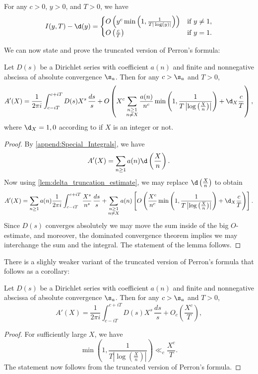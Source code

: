       \begin{lemma}\label{lem:delta_truncation_estimate}
        For any $c > 0$, $y > 0$, and $T > 0$, we have
        \[
          I(y,T)-\d(y) = \begin{cases} O\left(y^{c}\min\left(1,\frac{1}{T|\log(y)|}\right)\right) & \text{if $y \neq 1$}, \\ O\left(\frac{c}{T}\right) & \text{if $y = 1$}. \end{cases}
        \]
      \end{lemma}

      We can now state and prove the truncated version of Perron's formula:

      \begin{theorem}
        Let $D(s)$ be a Dirichlet series with coefficient $a(n)$ and finite and nonnegative abscissa of absolute convergence $\s_{a}$. Then for any $c > \s_{a}$ and $T > 0$,
        \[
          A'(X) = \frac{1}{2\pi i}\int_{c-iT}^{c+iT}D(s)X^{s}\,\frac{ds}{s}+O\left(X^{c}\sum_{\substack{n \ge 1 \\ n \neq X}}\frac{a(n)}{n^{c}}\min\left(1,\frac{1}{T\left|\log\left(\frac{X}{n}\right)\right|}\right)+\d_{X}\frac{c}{T}\right),
        \]
        where $\d_{X} = 1,0$ according to if $X$ is an integer or not.
      \end{theorem}
      \begin{proof}
        By \cref{append:Special_Integrals}, we have
        \[
          A'(X) = \sum_{n \ge 1}a(n)\d\left(\frac{X}{n}\right).
        \]
        Now using \cref{lem:delta_truncation_estimate}, we may replace $\d\left(\frac{X}{n}\right)$ to obtain
        \[
          A'(X) = \sum_{n \ge 1}a(n)\frac{1}{2\pi i}\int_{c-iT}^{c+iT}\frac{X^{s}}{n^{s}}\,\frac{ds}{s}+\sum_{\substack{n \ge 1 \\ n \neq X}}a(n)\left[O\left(\frac{X^{c}}{n^{c}}\min\left(1,\frac{1}{T\left|\log\left(\frac{X}{n}\right)\right|}\right)+\d_{X}\frac{c}{T}\right)\right].
        \]
        Since $D(s)$ converges absolutely we may move the sum inside of the big $O$-estimate, and moreover, the dominated convergence theorem implies we may interchange the sum and the integral. The statement of the lemma follows.
      \end{proof}

      There is a slighly weaker variant of the truncated version of Perron's formula that follows as a corollary:

      \begin{corollary}
        Let $D(s)$ be a Dirichlet series with coefficient $a(n)$ and finite and nonnegative abscissa of absolute convergence $\s_{a}$. Then for any $c > \s_{a}$ and $T > 0$,
        \[
          A'(X) = \frac{1}{2\pi i}\int_{c-iT}^{c+iT}D(s)X^{s}\,\frac{ds}{s}+O_{c}\left(\frac{X^{c}}{T}\right),
        \]
      \end{corollary}
      \begin{proof}
        For sufficiently large $X$, we have
        \[
          \min\left(1,\frac{1}{T\left|\log\left(\frac{X}{n}\right)\right|}\right) \ll_{c} \frac{X^{c}}{T}.
        \]
        The statement now follows from the truncated version of Perron's formula.
      \end{proof}

